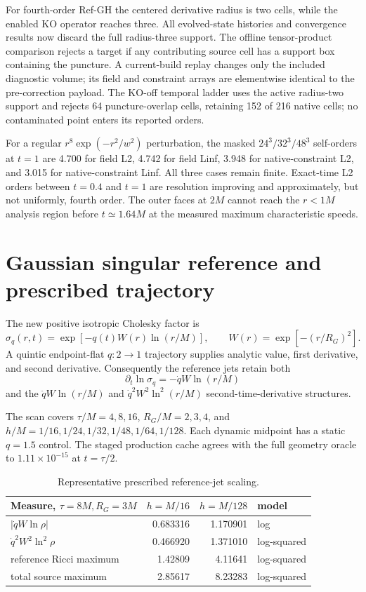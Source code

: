 \documentclass[11pt]{article}
\begin{document}
For fourth-order Ref-GH the centered derivative radius is two cells, while the
enabled KO operator reaches three.  All evolved-state histories and convergence
results now discard the full radius-three support.  The offline tensor-product
comparison rejects a target if any contributing source cell has a support box
containing the puncture.  A current-build replay changes only the included
diagnostic volume; its field and constraint arrays are elementwise identical to
the pre-correction payload. The KO-off temporal ladder uses the active
radius-two support and rejects 64 puncture-overlap cells, retaining 152 of 216
native cells; no contaminated point enters its reported orders.

For a regular $r^8\exp(-r^2/w^2)$ perturbation, the masked
$24^3/32^3/48^3$ self-orders at $t=1$ are 4.700 for field L2, 4.742 for field
Linf, 3.948 for native-constraint L2, and 3.015 for native-constraint Linf.
All three cases remain finite. Exact-time L2 orders between $t=0.4$ and $t=1$
are resolution improving and approximately, but not uniformly, fourth order.
The outer faces at $2M$ cannot reach the $r<1M$ analysis region before
$t\simeq1.64M$ at the measured maximum characteristic speeds.

\section{Gaussian singular reference and prescribed trajectory}

The new positive isotropic Cholesky factor is
\begin{equation}
 \sigma_q(r,t)=\exp[-q(t)W(r)\ln(r/M)],\qquad
 W(r)=\exp[-(r/R_G)^2].
\end{equation}
A quintic endpoint-flat $q:2\rightarrow1$ trajectory supplies analytic value,
first derivative, and second derivative.  Consequently the reference jets
retain both
\begin{equation}
 \partial_t\ln\sigma_q=-\dot q W\ln(r/M)
\end{equation}
and the $\ddot qW\ln(r/M)$ and
$\dot q^2W^2\ln^2(r/M)$ second-time-derivative structures.

The scan covers $\tau/M=4,8,16$, $R_G/M=2,3,4$, and
$h/M=1/16,1/24,1/32,1/48,1/64,1/128$.  Each dynamic midpoint has a static
$q=1.5$ control.  The staged production cache agrees with the full geometry
oracle to $1.11\times10^{-15}$ at $t=\tau/2$.

\begin{table}[ht]
\centering
\small
\begin{tabular}{lrrl}
\toprule
Measure, $\tau=8M,R_G=3M$ & $h=M/16$ & $h=M/128$ & model\\
\midrule
$|\dot qW\ln\rho|$ & 0.683316 & 1.170901 & log\\
$\dot q^2W^2\ln^2\rho$ & 0.466920 & 1.371010 & log-squared\\
reference Ricci maximum & 1.42809 & 4.11641 & log-squared\\
total source maximum & 2.85617 & 8.23283 & log-squared\\
\bottomrule
\end{tabular}
\caption{Representative prescribed reference-jet scaling.}
\end{table}
\end{document}

